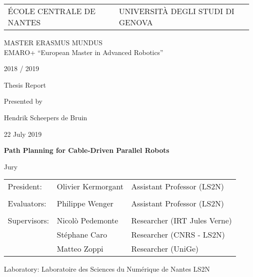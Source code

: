 \def\lskip{\vspace{0.5cm}}


\begin{tabular}{p{7cm}p{8cm}}
	ÉCOLE CENTRALE DE NANTES & UNIVERSITÀ DEGLI STUDI DI GENOVA
\end{tabular}

\vspace{2cm}

\begin{center}
	\large\sc MASTER ERASMUS MUNDUS \\ 
	\normalsize{EMARO+ ``European Master in Advanced Robotics''}
\end{center}

\begin{center}
	2018 / 2019
	\lskip%

	Thesis Report
	\lskip%

	Presented by
	\lskip%

	Hendrik Scheepers de Bruin
	\lskip%

	22 July 2019
	\lskip\lskip%

	{\Large \textbf{Path Planning for Cable-Driven Parallel Robots}}

\end{center}

\vfill

\begin{center}
	Jury
\end{center}

\begin{tabular}{p{} p{} p{}}
	President:		& Olivier Kermorgant	& Assistant Professor (LS2N) \\
	\\
	Evaluators:		& Philippe Wenger 		& Assistant Professor (LS2N) \\
	\\
	Supervisors:	& Nicolò Pedemonte		& Researcher (IRT Jules Verne) \\
					& Stéphane Caro			& Researcher (CNRS - LS2N) \\
					& Matteo Zoppi			& Researcher (UniGe)
\end{tabular}

\lskip%

Laboratory: Laboratoire des Sciences du Numérique de Nantes LS2N

